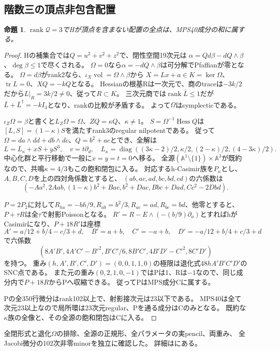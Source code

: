 \documentclass[a4paper,11pt]{ltjsarticle}
\newtheorem{proposition}{命題}[section]
\theoremstyle{definition}
\newcommand{\rank}{\operatorname{rank}}
\begin{document}
\subsection{階数三の頂点非包含配置}
\begin{proposition}\label{prop:rank3-homogeneous}
$\rank\mathcal Q=3$でHが頂点を含まない配置の全点は、MPS40成分の和に属する。
\end{proposition}
\begin{proof}
Hの補集合では$Q=u^2+v^2+z^2$で、閉性空間19次元は
$\alpha=Qd\beta-dQ\wedge\beta$、$\deg\beta\le1$で尽くされる。
$\Omega=0$なら$\alpha=-dQ\wedge\beta$は可分解でPfaffianが零となる。
$\Omega=d\beta$がrank2なら、$\iota_X\operatorname{vol}=\Omega\wedge\beta$から
$X=Lx+a\in K=\ker\Omega$、$\operatorname{tr}L=0$、$XQ=-kQ$となる。
Hessianの根基Rは一次元で、商のtraceは$-3k/2$だから$L|_R=3k/2\ne0$、従って$R\subset K$。
三次元商では$\rank\bar L\le1$だが$\bar L+\bar L^\dagger=-kI_3$となり、rankの比較が矛盾する。
よって$\Omega$はsymplecticである。

$\iota_Z\Omega=\beta$と書くと$L_Z\Omega=\Omega$、$ZQ=\kappa Q$、$\kappa\ne1$。
$S=\Omega^{-1}\operatorname{Hess}Q$は$[L,S]=(1-\kappa)S$を満たすrank3のregular nilpotentである。
従って$\Omega=da\wedge dd+db\wedge dc$、$Q=b^2+ac$とでき、全解は
\[
 L=L_\kappa+xS+yS^3,\quad v=t\partial_d,\quad
 L_\kappa=\operatorname{diag}((3\kappa-2)/2,\kappa/2,(2-\kappa)/2,(4-3\kappa)/2).
\]
中心化群と平行移動で一般に$x=y=t=0$へ移る。
全源$(\mathbb A^1\setminus\{1\})\times\mathbb A^3$が既約なので、共鳴$\kappa=4/3$もこの飽和閉包に入る。
対応するh-Casimir族を$P_\kappa$とし、$A,B,C,D$を上の四対角係数とすると、
$(ab,ac,ad,bc,bd,cd)$の六係数は
\[
 (-Aa^2,2Aab,(1-\kappa)b^2+Bac,b^2+Dac,Bbc+Dad,Cc^2-2Dbd).
\]

$P=2P_2$に対して$R_{ha}=-bh/9,R_{ab}=b^2/3,R_{ac}=ad,R_{bc}=bd$、他零とすると、
$P+\tau R$は全$\tau$で射影Poissonとなる。
$R'=R-E\wedge(-(b/9)\partial_a)$とすればhがCasimirになり、$P+18R'$は座標
\[
 A'=a/12+b/4-c/3+d,\quad B'=a+b,\quad C'=-a+b,\quad
 D'=-a/12+b/4+c/3+d
\]
で六係数
\[
 (8A'B',4A'C'-B'^2,B'C'/6,8B'C',4B'D'-C'^2,8C'D')
\]
を持つ。
重み$(h,A',B',C',D')=(0,0,1,1,0)$の極限は退化式$48hA'B'C'D'$のSNC点である。
また元の重み$(0,2,1,0,-1)$ではPは1、Rは$-1$なので、同じ成分内で$P+18R$からPへ収縮できる。
従ってPはMPS成分Cに属する。

Pの全350行微分はrank102以上で、射影接次元は23以下である。
MPS40は全て次元23以上なので局所環は23次元regular、Pを通る成分はCのみとなる。
既約な$\kappa$族の全像と、その全源の飽和閉包はCに入る。
\end{proof}
全閉形式と退化$\Omega$の排除、全源の正規形、全パラメータの実pencil、両重み、
全Jacobi微分の102次非零minorを独立に確認した。
詳細はにある。
\end{document}
